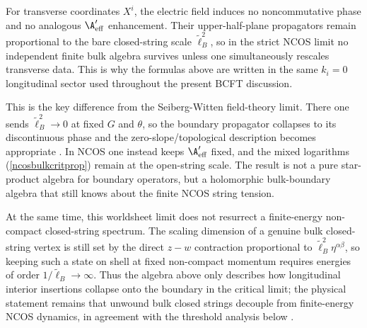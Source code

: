 \documentclass[12pt]{article}
\newcommand{\wt}[1]{\widetilde{#1}}
\begin{document}
For transverse coordinates $X^i$, the electric field induces no noncommutative phase and no analogous $\A'_{\rm eff}$ enhancement. Their upper-half-plane propagators remain proportional to the bare closed-string scale $\wt\ell_B^2$, so in the strict NCOS limit no independent finite bulk algebra survives unless one simultaneously rescales transverse data. This is why the formulas above are written in the same $k_i=0$ longitudinal sector used throughout the present BCFT discussion.

This is the key difference from the Seiberg-Witten field-theory limit. There one sends $\wt\ell_B^2\to0$ at fixed $G$ and $\theta$, so the boundary propagator collapses to its discontinuous phase and the zero-slope/topological description becomes appropriate \cite{seiberg1999stringtheorynoncommutativegeometry}. In NCOS one instead keeps $\A'_{\rm eff}$ fixed, and the mixed logarithms (\ref{ncosbulkcritprop}) remain at the open-string scale. The result is not a pure star-product algebra for boundary operators, but a holomorphic bulk-boundary algebra that still knows about the finite NCOS string tension.

At the same time, this worldsheet limit does not resurrect a finite-energy non-compact closed-string spectrum. The scaling dimension of a genuine bulk closed-string vertex is still set by the direct $z-w$ contraction proportional to $\wt\ell_B^2\eta^{\alpha\beta}$, so keeping such a state on shell at fixed non-compact momentum requires energies of order $1/\wt\ell_B\to\infty$. Thus the algebra above only describes how longitudinal interior insertions collapse onto the boundary in the critical limit; the physical statement remains that unwound bulk closed strings decouple from finite-energy NCOS dynamics, in agreement with the threshold analysis below \cite{seiberg2000stringsbackgroundelectricfield,gopakumar2000sdualitynoncommutativegaugetheory}.
\end{document}
